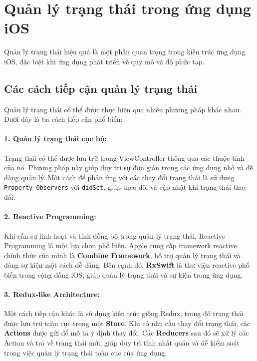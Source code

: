 \section{Quản lý trạng thái trong ứng dụng iOS}

Quản lý trạng thái hiệu quả là một phần quan trọng trong kiến trúc ứng dụng iOS, đặc biệt khi ứng dụng phát triển về quy mô và độ phức tạp.

\subsection{Các cách tiếp cận quản lý trạng thái}

Quản lý trạng thái có thể được thực hiện qua nhiều phương pháp khác nhau. Dưới đây là ba cách tiếp cận phổ biến:

\paragraph*{1. Quản lý trạng thái cục bộ:}
Trạng thái có thể được lưu trữ trong ViewController thông qua các thuộc tính của nó. Phương pháp này giúp duy trì sự đơn giản trong các ứng dụng nhỏ và dễ dàng quản lý. Một cách để phản ứng với các thay đổi trạng thái là sử dụng \texttt{Property Observers} với \texttt{didSet}, giúp theo dõi và cập nhật khi trạng thái thay đổi.

\paragraph*{2. Reactive Programming:}
Khi cần sự linh hoạt và tính đồng bộ trong quản lý trạng thái, Reactive Programming là một lựa chọn phổ biến. Apple cung cấp framework reactive chính thức của mình là \textbf{Combine Framework}, hỗ trợ quản lý trạng thái và dòng sự kiện một cách dễ dàng. Bên cạnh đó, \textbf{RxSwift} là thư viện reactive phổ biến trong cộng đồng iOS, giúp quản lý trạng thái và sự kiện trong ứng dụng.

\paragraph*{3. Redux-like Architecture:}
Một cách tiếp cận khác là sử dụng kiến trúc giống Redux, trong đó trạng thái được lưu trữ toàn cục trong một \textbf{Store}. Khi có nhu cầu thay đổi trạng thái, các \textbf{Actions} được gửi để mô tả ý định thay đổi. Các \textbf{Reducers} sau đó sẽ xử lý các Action và trả về trạng thái mới, giúp duy trì tính nhất quán và dễ kiểm soát trong việc quản lý trạng thái toàn cục của ứng dụng.


